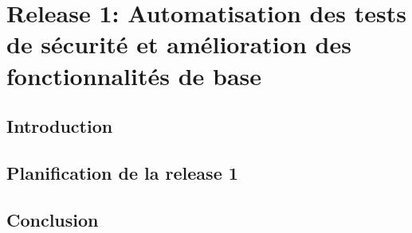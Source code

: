 \chapter{Release 1: Automatisation des tests de sécurité et amélioration des fonctionnalités de base}
\renewcommand{\thesection}{\arabic{section}}
\begin{justify}
    \vspace{-1.2cm}
    \section*{\texorpdfstring{Introduction}{Introduction}}
    
    \section{Planification de la release 1}
    
    
    
    \section*{\texorpdfstring{Conclusion}{Conclusion}}
    
\end{justify}   